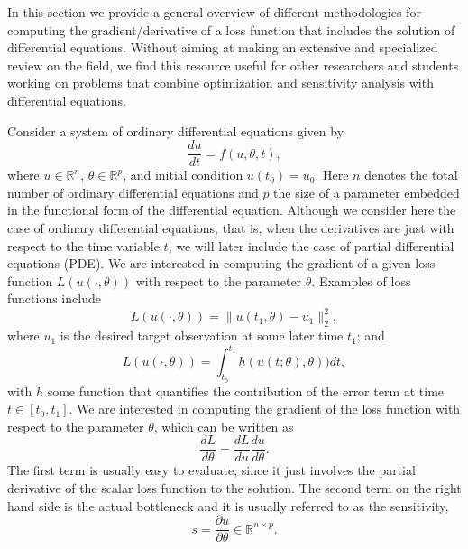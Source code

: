 In this section we provide a general overview of different methodologies for computing the gradient/derivative of a loss function that includes the solution of differential equations. 
Without aiming at making an extensive and specialized review on the field, we find this resource useful for other researchers and students working on problems that combine optimization and sensitivity analysis with differential equations. 

Consider a system of ordinary differential equations given by
\begin{equation}
 \frac{du}{dt} = f(u, \theta, t),
 \label{eq:original_ODE}
\end{equation}
where $u \in \mathbb{R}^n$, $\theta \in \mathbb R^p$, and initial condition $u(t_0) = u_0$. 
Here $n$ denotes the total number of ordinary differential equations and $p$ the size of a parameter embedded in the functional form of the differential equation. 
Although we consider here the case of ordinary differential equations, that is, when the derivatives are just with respect to the time variable $t$, we will later include the case of partial differential equations (PDE).
We are interested in computing the gradient of a given loss function $L(u(\cdot, \theta))$ with respect to the parameter $\theta$. 
Examples of loss functions include
\begin{equation}
 L(u(\cdot, \theta)) = \| u(t_1, \theta) - u_1 \|_2^2,
\end{equation}
where $u_1$ is the desired target observation at some later time $t_1$; and
\begin{equation}
 L(u(\cdot, \theta)) = \int_{t_0}^{t_1} h( u(t;\theta), \theta) ) dt, 
\end{equation}
with $h$ some function that quantifies the contribution of the error term at time $t \in [t_0, t_1]$.
We are interested in computing the gradient of the loss function with respect to the parameter $\theta$, which can be written as
\begin{equation}
 \frac{dL}{d\theta} = \frac{dL}{du} \frac{du}{d\theta}.
 \label{eq:dLdtheta_VJP}
\end{equation} 
The first term is usually easy to evaluate, since it just involves the partial derivative of the scalar loss function to the solution. 
The second term on the right hand side is the actual bottleneck and it is usually referred to as the sensitivity,
\begin{equation}
 s = \frac{\partial u}{\partial \theta} \in \mathbb R^{n \times p}.
\end{equation}

